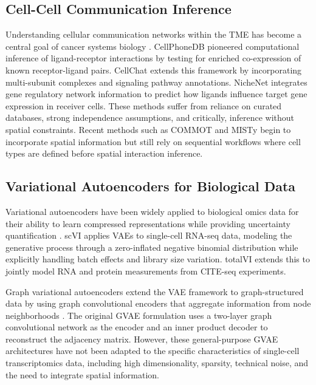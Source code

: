 \documentclass{article}
\begin{document}
\subsection{Cell-Cell Communication Inference}

Understanding cellular communication networks within the TME has become a central goal of cancer systems biology \citep{armingol2021deciphering}. CellPhoneDB \citep{efremova2020cellphonedb} pioneered computational inference of ligand-receptor interactions by testing for enriched co-expression of known receptor-ligand pairs. CellChat \citep{jin2021inference} extends this framework by incorporating multi-subunit complexes and signaling pathway annotations. NicheNet \citep{browaeys2020nichenet} integrates gene regulatory network information to predict how ligands influence target gene expression in receiver cells. These methods suffer from reliance on curated databases, strong independence assumptions, and critically, inference without spatial constraints. Recent methods such as COMMOT \citep{cang2023inferring} and MISTy \citep{tanevski2020explainable} begin to incorporate spatial information but still rely on sequential workflows where cell types are defined before spatial interaction inference.

\subsection{Variational Autoencoders for Biological Data}

Variational autoencoders have been widely applied to biological omics data for their ability to learn compressed representations while providing uncertainty quantification \citep{way2018extracting}. scVI \citep{lopez2018deep} applies VAEs to single-cell RNA-seq data, modeling the generative process through a zero-inflated negative binomial distribution while explicitly handling batch effects and library size variation. totalVI \citep{gayoso2021joint} extends this to jointly model RNA and protein measurements from CITE-seq experiments.

Graph variational autoencoders extend the VAE framework to graph-structured data by using graph convolutional encoders that aggregate information from node neighborhoods \citep{kipf2016variational}. The original GVAE formulation uses a two-layer graph convolutional network as the encoder and an inner product decoder to reconstruct the adjacency matrix. However, these general-purpose GVAE architectures have not been adapted to the specific characteristics of single-cell transcriptomics data, including high dimensionality, sparsity, technical noise, and the need to integrate spatial information.
\end{document}
